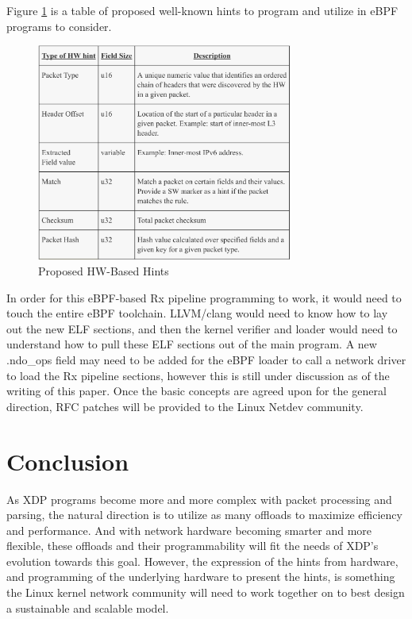 \documentclass[letterpaper]{article}
\begin{document}
\newline
\newline
\indent Figure \ref{xdp-hint-types} is a table of proposed well-known hints to program and utilize in eBPF programs to consider.

\begin{figure}[h]
\includegraphics[width=3.31in]{xdp-hint-types.png}
\caption{Proposed HW-Based Hints}
\label{xdp-hint-types}
\end{figure}

\indent In order for this eBPF-based Rx pipeline programming to work, it would need to touch the entire eBPF toolchain. LLVM/clang would need to know how to lay out the new ELF sections, and then the kernel verifier and loader would need to understand how to pull these ELF sections out of the main program. A new .ndo\_ops field may need to be added for the eBPF loader to call a network driver to load the Rx pipeline sections, however this is still under discussion as of the writing of this paper. Once the basic concepts are agreed upon for the general direction, RFC patches will be provided to the Linux Netdev community.

\section{Conclusion}
As XDP programs become more and more complex with packet processing and parsing, the natural direction is to utilize as many offloads to maximize efficiency and performance. And with network hardware becoming smarter and more flexible, these offloads and their programmability will fit the needs of XDP's evolution towards this goal. However, the expression of the hints from hardware, and programming of the underlying hardware to present the hints, is something the Linux kernel network community will need to work together on to best design a sustainable and scalable model.
\end{document}
